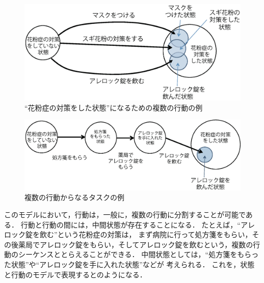 \documentclass[submit,techreq]{ipsj}
\begin{document}
\begin{figure}[t]
\centering
\includegraphics[width=0.85\hsize]{parallel.eps}
\vspace{-0.5em}
\caption{``花粉症の対策をした状態''になるための複数の行動の例}
\label{fig:parallel}
\vspace{-0.5em}
\end{figure}



\begin{figure}[t]
\centering
\includegraphics[width=0.85\hsize]{sequence.eps}
\vspace{-0.5em}
\caption{複数の行動からなるタスクの例}
\label{fig:sequence}
\vspace{-0.5em}
\end{figure}

このモデルにおいて，行動は，一般に，複数の行動に分割することが可能である．
行動と行動の間には，中間状態が存在することになる．
たとえば，``アレロック錠を飲む''という花粉症の対策は，
まず病院に行って処方箋をもらい，その後薬局でアレロック錠をもらい，そしてアレロック錠を飲むという，複数の行動のシーケンスととらえることができる．
中間状態としては，``処方箋をもらった状態''や``アレロック錠を手に入れた状態''などが
考えられる．
これを，状態と行動のモデルで表現するとのようになる．


\end{document}

